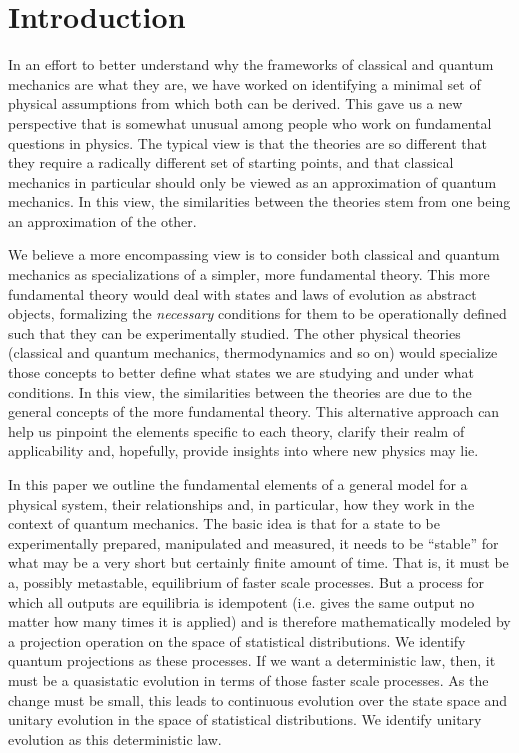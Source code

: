 \documentclass[applsci,article,submit,moreauthors,pdftex]{Definitions/mdpi}
\begin{document}

\section{Introduction}

In an effort to better understand why the frameworks of classical and quantum mechanics are what they are, we have worked on identifying a minimal set of physical assumptions from which both can be derived.\cite{Carc1} This gave us a new perspective that is somewhat unusual among people who work on fundamental questions in physics. The typical view is that the theories are so different that they require a radically different set of starting points, and that classical mechanics in particular should only be viewed as an approximation of quantum mechanics. In this view, the similarities between the theories stem from one being an approximation of the other.

We believe a more encompassing view is to consider both classical and quantum mechanics as specializations of a simpler, more fundamental theory. This more fundamental theory would deal with states and laws of evolution as abstract objects, formalizing the \emph{necessary} conditions for them to be operationally defined such that they can be experimentally studied. The other physical theories (classical and quantum mechanics, thermodynamics and so on) would specialize those concepts to better define what states we are studying and under what conditions. In this view, the similarities between the theories are due to the general concepts of the more fundamental theory. This alternative approach can help us pinpoint the elements specific to each theory, clarify their realm of applicability and, hopefully, provide insights into where new physics may lie.

In this paper we outline the fundamental elements of a general model for a physical system, their relationships and, in particular, how they work in the context of quantum mechanics. The basic idea is that for a state to be experimentally prepared, manipulated and measured, it needs to be ``stable'' for what may be a very short but certainly finite amount of time. That is, it must be a, possibly metastable, equilibrium of faster scale processes. But a process for which all outputs are equilibria is idempotent (i.e. gives the same output no matter how many times it is applied) and is therefore mathematically modeled by a projection operation on the space of statistical distributions. We identify quantum projections as these processes. If we want a deterministic law, then, it must be a quasistatic evolution in terms of those faster scale processes. As the change must be small, this leads to continuous evolution over the state space and unitary evolution in the space of statistical distributions. We identify unitary evolution as this deterministic law.
\end{document}
